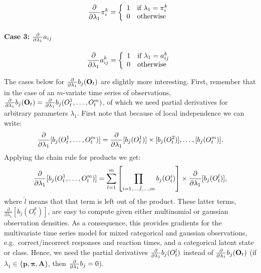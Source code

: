 \documentclass[a4paper,man,nobf]{apa}
\newcommand{\vc}{\mathbf}
\newcommand{\mat}{\mathbf}
\begin{document}
\begin{align} 
        \frac{\partial} {\partial \lambda_{1}} \pi_{i}^{k} = \left\{ \begin{array}{ll} 
            1 & \mbox{if $\lambda_{1}=\pi_{i}^{k}$} \\ 
            0 & \mbox{otherwise} 
            \end{array} \right. 
\end{align} 

\paragraph{Case 3: $\frac{\partial} {\partial \lambda_{1}} a_{ij}$ }

\begin{align} 
        \frac{\partial} {\partial \lambda_{1}} a_{ij}^{k}= \left\{ \begin{array}{ll} 
            1 & \mbox{if $\lambda_{1}=a_{ij}^{k}$} \\ 
            0 & \mbox{otherwise} 
            \end{array} \right. 
\end{align} 

The cases below for $\fpp b_{j}(\vc{O}_{t})$ are slightly more 
interesting. First, remember that in the case of an $m$-variate time 
series of observations, $\fpp b_{j}(\vc{O}_{t})=\fpp b_{j}(O_{t}^{1}, 
\ldots, O_{t}^{m})$, of which we need partial derivatives for 
arbitrary parameters $\lambda_{1}$. First note that because of local 
independence we can write:
\begin{equation}
	\frac{\partial} {\partial \lambda_{1}} [b_{j}(O_{t}^{1}, \ldots, O_{t}^{m})]= \frac{\partial} 
{\partial \lambda_{1} } [b_{j}(O_{t}^{1})] \times  
[b_{j}(O_{t}^{2})], \ldots,  [b_{j}(O_{t}^{m})].  
\end{equation}
Applying the chain rule for products we get:
\begin{equation}
	\frac{\partial} {\partial \lambda_{1}} [b_{j}(O_{t}^{1}, \ldots, O_{t}^{m})] =
	\sum_{l=1}^{m} \left[ \prod_{i=1, \ldots, \hat{l}, \ldots, m} 
b_{j}(O_{t}^{i}) \right] \times
	\frac{\partial} {\partial \lambda_{1}}  [b_{j}(O_{t}^{l})],
	\label{partialProd}
\end{equation}
where $\hat{l}$ means that that term is left out of the product. 
These latter terms, $\frac{\partial} {\partial \lambda_{1} }  
[b_{j}(O_{t}^{k})]$, are easy to compute given either multinomial or 
gaussian observation densities. As a consequence, this provides 
gradients for the multivariate time series model for mixed 
categorical and gaussian observations, e.g.\ correct/incorrect 
responses and reaction times, and a categorical latent state or 
class.  Hence, we need the partial derivatives $\frac{\partial} {\partial \lambda_{1}} 
b_{j}({O}_{t}^{l})$ instead of $\fpp b_{j}(\vc{O}_{t})$ (if 
$\lambda_{1} \in \{ \vc{p}, \pmb{\pi},\mat{A} \} $, then $\frac{\partial} {\partial \lambda_{1}} 
b_{j}=0$).
\end{document}
